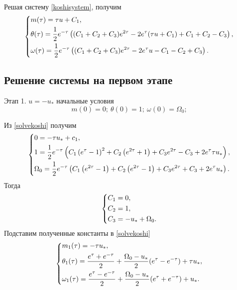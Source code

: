 \documentclass[a4paper,12pt, openany]{book}
\theoremstyle{plain} %
\theoremstyle{definition} %
\theoremstyle{remark} %
\numberwithin{equation}{chapter}
\begin{document}
{Решая систему \eqref{koshisystem}, получим
\begin{equation}\label{solvekoshi}
    \left\{ {\begin{aligned}
                 & m(\tau) = \tau u+C_1, \hfill                                                            \\
                 & \theta(\tau) = \frac{1}{2} e^{-\tau } \left((C_1+C_2+C_3) e^{2 \tau }-2 e^{\tau } (\tau
                u+C_1)+C_1+C_2-C_3\right), \hfill                                                          \\
                 & \omega(\tau) = \frac{1}{2} e^{-\tau } \left((C_1+C_2+C_3) e^{2 \tau }-2 e^{\tau }
                u-C_1-C_2+C_3\right). \hfill                                                               \\
            \end{aligned}} \right.
\end{equation}

\subsection*{Решение системы на первом этапе}
Этап 1. $u=-u_*$ начальные условия
\[
    m(0)=0;\ \theta(0)=1;\ \omega(0)=\Omega_0;
\]

Из \eqref{solvekoshi} получим
\[
    \left\{ {\begin{aligned}
                 & 0 = -\tau  u_*+c_1, \hfill                                                            \\
                 & 1 = \frac{1}{2} e^{-\tau } \left(C_1 \left(e^{\tau }-1\right)^2+C_2 \left(e^{2
                \tau }+1\right)+C_3 e^{2 \tau }-C_3+2 e^{\tau } \tau  u_*\right) , \hfill                \\
                 & \Omega_0 = \frac{1}{2} e^{-\tau } \left(C_1 \left(e^{2 \tau }-1\right)+C_2 \left(e^{2
                \tau }-1\right)+C_3 e^{2 \tau }+C_3+2 e^{\tau } u_*\right)  . \hfill                     \\
            \end{aligned}} \right.
\]
Тогда
\[
    \left\{ {\begin{aligned}
                 & C_1 = 0, \hfill             \\
                 & C_2 = 1, \hfill             \\
                 & C_3 = -u_*+\Omega_0. \hfill \\
            \end{aligned}} \right.
\]
Подставим полученные константы в \eqref{solvekoshi}
\[
    \left\{ {\begin{aligned}
                 & m_1(\tau) = -\tau  u_*, \hfill                                                                         \\
                 & \theta_1(\tau) = \frac{e^\tau+e^{-\tau}}{2}+\frac{\Omega_0-u_*}{2}(e^\tau-e^{-\tau})+\tau u_* , \hfill \\
                 & \omega_1(\tau) =\frac{e^\tau-e^{-\tau}}{2}+\frac{\Omega_0-u_*}{2}(e^\tau+e^{-\tau})+u_*   . \hfill     \\
            \end{aligned}} \right.
\]
}
\end{document}
